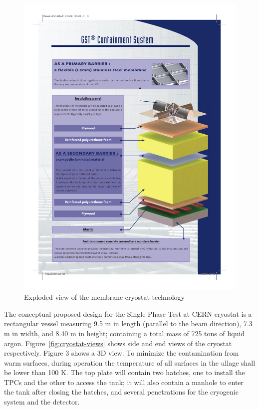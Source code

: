 \begin{figure}
\begin{center}
\includegraphics[width=.9\textwidth]{figures/membrane-exploded-view} %
\caption[Exploded view of the membrane cryostat technology]{\label{fig:lar-org} Exploded view of the membrane cryostat technology}
\end{center}
\end{figure}

The conceptual proposed design for the Single Phase Test at CERN cryostat is a rectangular vessel measuring 9.5 m in length (parallel to the beam direction), 7.3 m in width, and 8.40 m in height; containing a total mass of 725 tons of liquid argon. Figure~\ref{fig:cryostat-views} shows side and end views of the cryostat respectively. Figure 3 shows a 3D view. To minimize the contamination from warm surfaces, during operation the temperature of all surfaces in the ullage shall be lower than 100 K. 
The top plate will contain two hatches, one to install the TPCs and the other to access the tank; it will also contain a manhole to enter the tank after closing the hatches, and several penetrations for the cryogenic system and the detector. %

